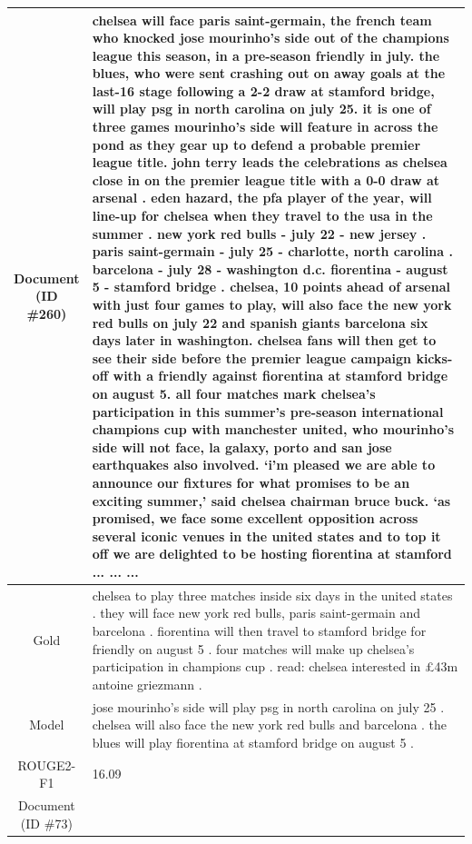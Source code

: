 \begin{table}[bth!]
\begin{tabular}{c|p{}}
\makecell{Document\\(ID \#260)} & 
chelsea will face paris saint-germain, the french team who knocked jose mourinho’s side out of the champions league this season, in a pre-season friendly in july. the blues, who were sent crashing out on away goals at the last-16 stage following a 2-2 draw at stamford bridge, will play psg in north carolina on july 25. it is one of three games mourinho’s side will feature in across the pond as they gear up to defend a probable premier league title. john terry leads the celebrations as chelsea close in on the premier league title with a 0-0 draw at arsenal . eden hazard, the pfa player of the year, will line-up for chelsea when they travel to the usa in the summer . new york red bulls - july 22 - new jersey . paris saint-germain - july 25 - charlotte, north carolina . barcelona - july 28 - washington d.c. fiorentina - august 5 - stamford bridge . chelsea, 10 points ahead of arsenal with just four games to play, will also face the new york red bulls on july 22 and spanish giants barcelona six days later in washington. chelsea fans will then get to see their side before the premier league campaign kicks-off with a friendly against fiorentina at stamford bridge on august 5. all four matches mark chelsea’s participation in this summer’s pre-season international champions cup with manchester united, who mourinho’s side will not face, la galaxy, porto and san jose earthquakes also involved. ‘i’m pleased we are able to announce our fixtures for what promises to be an exciting summer,' said chelsea chairman bruce buck. ‘as promised, we face some excellent opposition across several iconic venues in the united states and to top it off we are delighted to be hosting fiorentina at stamford ... ... ... 
\\ \hline
Gold & 
chelsea to play three matches inside six days in the united states . they will face new york red bulls, paris saint-germain and barcelona . fiorentina will then travel to stamford bridge for friendly on august 5 . four matches will make up chelsea's participation in champions cup . read: chelsea interested in £43m antoine griezmann .
\\ \hline
Model & 
jose mourinho's side will play psg in north carolina on july 25 . chelsea will also face the new york red bulls and barcelona . the blues will play fiorentina at stamford bridge on august 5 .
\\ \hline
ROUGE2-F1 & 
16.09
\\ \hline
\makecell{Document\\(ID \#73)} & 

\end{tabular}
\end{table}
